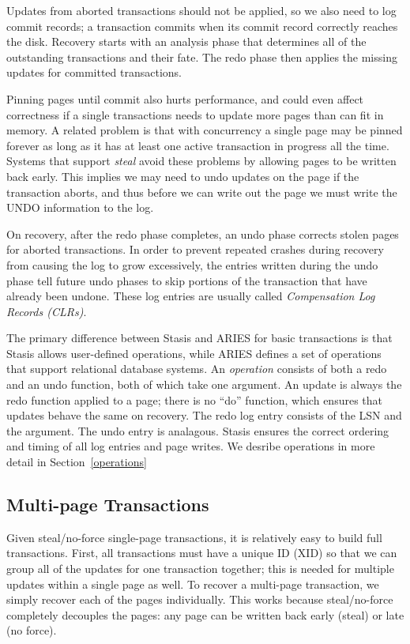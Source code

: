 \documentclass[letterpaper,twocolumn,10pt]{article}
\newcommand{\yad}{Stasis\xspace}
\begin{document}
Updates from aborted transactions should not be applied, so we also
need to log commit records; a transaction commits when its commit
record correctly reaches the disk. Recovery starts with an analysis
phase that determines all of the outstanding transactions and their
fate.  The redo phase then applies the missing updates for committed
transactions.

Pinning pages until commit also hurts performance, and could even
affect correctness if a single transactions needs to update more pages
than can fit in memory. A related problem is that with concurrency a
single page may be pinned forever as long as it has at least one
active transaction in progress all the time.  Systems that support
{\em steal} avoid these problems by allowing pages to be written back
early.  This implies we may need to undo updates on the page if the
transaction aborts, and thus before we can write out the page we must
write the UNDO information to the log. 

On recovery, after the redo phase completes, an undo phase corrects
stolen pages for aborted transactions.  In order to prevent repeated
crashes during recovery from causing the log to grow excessively, the
entries written during the undo phase tell future undo phases to skip
portions of the transaction that have already been undone.  These log
entries are usually called {\em Compensation Log Records (CLRs)}.


The primary difference between \yad and ARIES for basic transactions
is that \yad allows user-defined operations, while ARIES defines a set 
of operations that support relational database systems.  An {\em operation}
consists of both a redo and an undo function, both of which take one
argument. An update is always the redo function applied to a page;
there is no ``do'' function, which ensures that updates behave the same
on recovery.  The redo log entry consists of the LSN and the argument.
The undo entry is analagous.  \yad ensures the correct ordering and
timing of all log entries and page writes.  We desribe operations in
more detail in Section~\ref{operations}


\subsection{Multi-page Transactions}

Given steal/no-force single-page transactions, it is relatively easy
to build full transactions. First, all transactions must have a unique
ID (XID) so that we can group all of the updates for one transaction
together; this is needed for multiple updates within a single page as
well.  To recover a multi-page transaction, we simply recover each of
the pages individually.  This works because steal/no-force completely
decouples the pages: any page can be written back early (steal) or
late (no force).  
\end{document}
